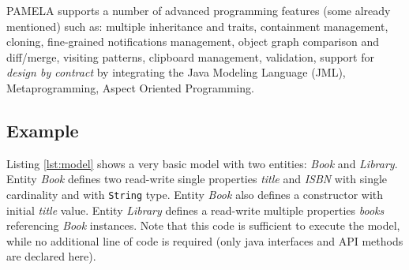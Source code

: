 PAMELA supports a number of advanced programming features (some already mentioned) such as:  multiple inheritance and traits, containment management, cloning, fine-grained notifications management, object graph comparison and diff/merge, visiting patterns, clipboard management, validation, support for \emph{design by contract} by integrating the Java Modeling Language (JML), Metaprogramming, Aspect Oriented Programming.



\subsection{Example}

Listing \ref{lst:model} shows a very basic model with two entities: \emph{Book} and \emph{Library}. Entity \emph{Book} defines two read-write single properties \emph{title} and \emph{ISBN} with single cardinality and with \texttt{String} type. Entity \emph{Book} also defines a constructor with initial \emph{title} value. Entity \emph{Library} defines a read-write multiple properties \emph{books} referencing \emph{Book} instances. Note that this code is sufficient to execute the model, while no additional line of code is required (only java interfaces and API methods are declared here). 

